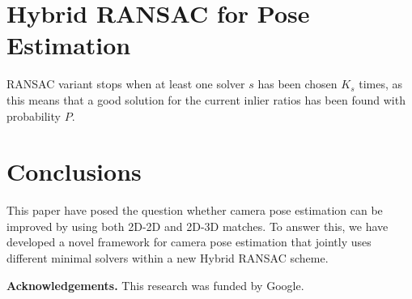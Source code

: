 \documentclass[10pt,twocolumn,letterpaper]{article}
\begin{document}
\section{Hybrid RANSAC for Pose Estimation}
RANSAC variant stops when at least one solver
$s$ has been chosen $K_s$ times, as this means that a good solution
for the current inlier ratios has been found with probability
$P$.

\section{Conclusions}
This paper have posed the question whether camera pose estimation can be improved by using both 2D-2D and 2D-3D matches. To answer this, we have developed a novel framework for camera pose estimation that jointly uses different minimal solvers within a new Hybrid RANSAC scheme.\par
\textbf{Acknowledgements.} This research was funded by Google.\par

{\small


}
\end{document}
